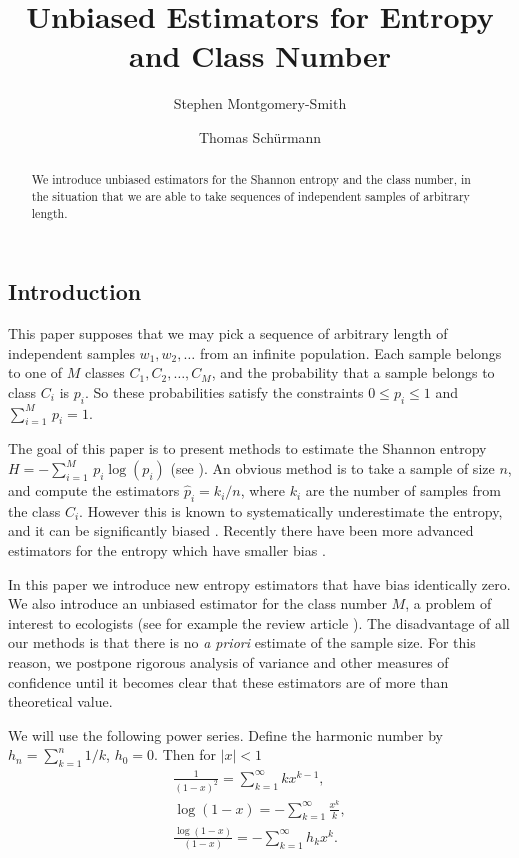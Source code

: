 \documentclass{amsart}
\title{Unbiased Estimators for Entropy and Class Number}
\author{Stephen Montgomery-Smith}
\author{Thomas Sch\"urmann}
\begin{document}
\begin{abstract}We introduce unbiased estimators for the Shannon entropy 
and the class number, in the situation that
we are able to take sequences of independent samples of arbitrary 
length.\end{abstract}

\maketitle

\subsection*{Introduction}

This paper supposes that we may pick a sequence of arbitrary length
of independent samples 
$w_1,w_2,\dots$ from
an infinite population.  
Each sample belongs to one of $M$ classes $C_1,C_2,\dots,C_M$, 
and the probability that a sample belongs to
class $C_i$ is $p_i$.  So these probabilities
satisfy the constraints $0\le p_i\le 1$ and $\sum_{i=1}^M\,p_i =1$.

The goal of this paper is to present methods to 
estimate the Shannon entropy $H=-\sum_{i=1}^M\,p_i\log(p_i)$
(see \cite{shann}).
An obvious method is to take a sample of size $n$, and compute the 
estimators $\hat p_i = k_i/n$, where $k_i$ are the number
of samples from the class $C_i$.  
However this is known to systematically underestimate the entropy, 
and it can be significantly
biased \cite{grass88}\cite{harris}\cite{herzel}\cite{miller}.  
Recently there have been more advanced estimators for the entropy
which have smaller bias 
\cite{grass88}\cite{grass03}\cite{harris}\cite{herzel}\cite{miller}\cite{schuer}. 

In this paper we introduce new entropy estimators that have bias identically 
zero.  
We also introduce an unbiased estimator for the class number $M$, a problem
of interest to ecologists (see for example the review article \cite{chao05}).
The disadvantage of all our methods is that there is no
\emph{a priori} estimate of the sample size.  
For this reason, we postpone rigorous
analysis of variance and other measures of confidence until it 
becomes clear that these estimators are of more than theoretical value.

We will use the following power series.  Define the harmonic number by
$h_n = \sum_{k=1}^n 1/k$, $h_0 = 0$.  Then for $|x|<1$
\begin{eqnarray*} 
   \frac1{(1-x)^2} = \displaystyle \sum_{k=1}^\infty k x^{k-1} ,
\\
   \log(1-x) = - \displaystyle \sum_{k=1}^\infty \frac{x^k}k ,
\\
   \frac{\log(1-x)}{(1-x)} = - \displaystyle \sum_{k=1}^\infty h_k x^k .
\end{eqnarray*}
\end{document}
